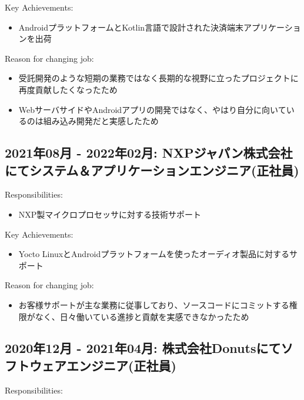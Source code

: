 \documentclass[letterpaper]{article}
\begin{document}
\noindent Key Achievements:

\begin{itemize}
  \item AndroidプラットフォームとKotlin言語で設計された決済端末アプリケーションを出荷
\end{itemize}

\noindent Reason for changing job:

\begin{itemize}
  \item 受託開発のような短期の業務ではなく長期的な視野に立ったプロジェクトに再度貢献したくなったため
  \item WebサーバサイドやAndroidアプリの開発ではなく、やはり自分に向いているのは組み込み開発だと実感したため
\end{itemize}

\subsection*{2021年08月 - 2022年02月: NXPジャパン株式会社にてシステム＆アプリケーションエンジニア(正社員)}

\noindent Responsibilities:

\begin{itemize}
  \item NXP製マイクロプロセッサに対する技術サポート
\end{itemize}

\noindent Key Achievements:

\begin{itemize}
  \item Yocto LinuxとAndroidプラットフォームを使ったオーディオ製品に対するサポート
\end{itemize}

\noindent Reason for changing job:

\begin{itemize}
  \item お客様サポートが主な業務に従事しており、ソースコードにコミットする権限がなく、日々働いている進捗と貢献を実感できなかったため
\end{itemize}

\subsection*{2020年12月 - 2021年04月: 株式会社Donutsにてソフトウェアエンジニア(正社員)}

\noindent Responsibilities:
\end{document}
